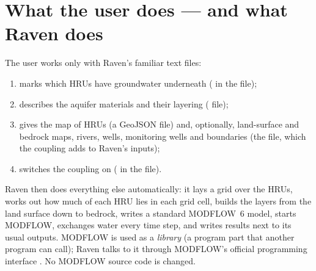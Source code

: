 \section{What the user does --- and what Raven does}
The user works only with Raven's familiar text files:
\begin{enumerate}
\item marks which HRUs have groundwater underneath ( in the  file);
\item describes the aquifer materials and their layering ( file);
\item gives the map of HRUs (a GeoJSON file) and, optionally, land-surface and bedrock maps, rivers, wells,
monitoring wells and boundaries (the  file, which the coupling adds to Raven's inputs);
\item switches the coupling on ( in the  file).
\end{enumerate}
Raven then does everything else automatically: it lays a grid over the HRUs, works out how much of each HRU lies in
each grid cell, builds the layers from the land surface down to bedrock, writes a standard MODFLOW~6 model, starts
MODFLOW, exchanges water every time step, and writes results next to its usual outputs. MODFLOW is used as a
\emph{library} (a program part that another program can call); Raven talks to it through MODFLOW's official
programming interface \cite{hughes2022xmi}. No MODFLOW source code is changed.


